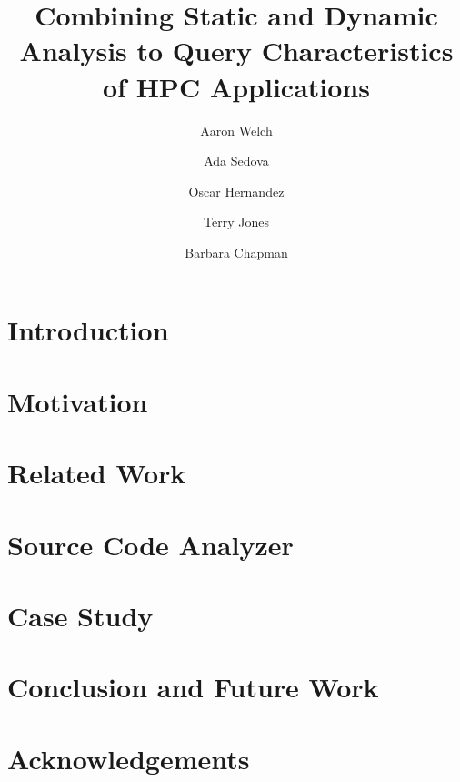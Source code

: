 \documentclass[conference]{IEEEtran}
\begin{document}
\title{\LARGE \bf
Combining Static and Dynamic Analysis to Query Characteristics of \acs{HPC} Applications
}
\author[1, 2]{Aaron Welch}
\author[1]{Ada Sedova}
\author[1]{Oscar Hernandez}
\author[1]{Terry Jones}
\author[3]{Barbara Chapman}

\maketitle
\begin{abstract}

\end{abstract}
\section{Introduction}
\label{sec:intro}

\section{Motivation}
\label{sec:motivation}

\section{Related Work}
\label{sec:related}

\section{Source Code Analyzer}
\label{sec:analysis}

\section{Case Study}
\label{sec:casestudy}

\section{Conclusion and Future Work}
\label{sec:conclusion}

\section*{Acknowledgements}
\label{sec:ack}



\end{document}
